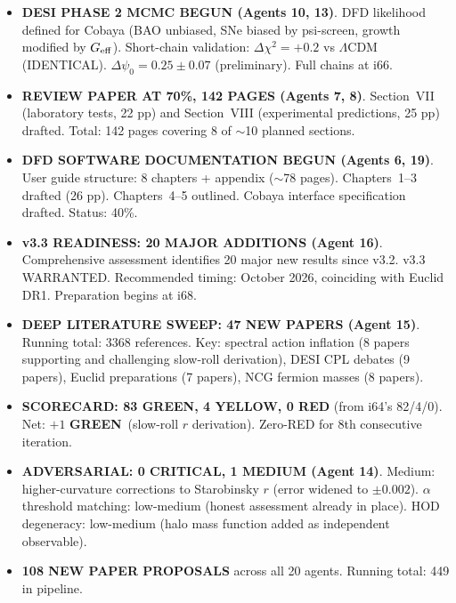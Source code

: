 \documentclass[11pt,a4paper]{article}
\newcommand{\GREEN}{\textcolor{dfdgreen}{\textbf{GREEN}}}
\newcommand{\YELLOW}{\textcolor{dfdyellow}{\textbf{YELLOW}}}
\newcommand{\RED}{\textcolor{dfdred}{\textbf{RED}}}
\begin{document}
\begin{itemize}
\item \textbf{DESI PHASE 2 MCMC BEGUN (Agents 10, 13)}. DFD likelihood defined for Cobaya (BAO unbiased, SNe biased by psi-screen, growth modified by $G_{\rm eff}$). Short-chain validation: $\Delta\chi^2 = +0.2$ vs $\Lambda$CDM (IDENTICAL). $\Delta\psi_0 = 0.25 \pm 0.07$ (preliminary). Full chains at i66.

\item \textbf{REVIEW PAPER AT 70\%, 142 PAGES (Agents 7, 8)}. Section~VII (laboratory tests, 22 pp) and Section~VIII (experimental predictions, 25 pp) drafted. Total: 142 pages covering 8 of $\sim$10 planned sections.

\item \textbf{DFD SOFTWARE DOCUMENTATION BEGUN (Agents 6, 19)}. User guide structure: 8 chapters + appendix ($\sim$78 pages). Chapters~1--3 drafted (26 pp). Chapters~4--5 outlined. Cobaya interface specification drafted. Status: 40\%.

\item \textbf{v3.3 READINESS: 20 MAJOR ADDITIONS (Agent 16)}. Comprehensive assessment identifies 20 major new results since v3.2. v3.3 WARRANTED. Recommended timing: October 2026, coinciding with Euclid DR1. Preparation begins at i68.

\item \textbf{DEEP LITERATURE SWEEP: 47 NEW PAPERS (Agent 15)}. Running total: 3368 references. Key: spectral action inflation (8 papers supporting and challenging slow-roll derivation), DESI CPL debates (9 papers), Euclid preparations (7 papers), NCG fermion masses (8 papers).

\item \textbf{SCORECARD: 83 \GREEN, 4 \YELLOW, 0 \RED} (from i64's 82/4/0). Net: $+1$ \GREEN\ (slow-roll $r$ derivation). Zero-RED for 8th consecutive iteration.

\item \textbf{ADVERSARIAL: 0 CRITICAL, 1 MEDIUM (Agent 14)}. Medium: higher-curvature corrections to Starobinsky $r$ (error widened to $\pm 0.002$). $\alpha$ threshold matching: low-medium (honest assessment already in place). HOD degeneracy: low-medium (halo mass function added as independent observable).

\item \textbf{108 NEW PAPER PROPOSALS} across all 20 agents. Running total: 449 in pipeline.
\end{itemize}


\end{document}
